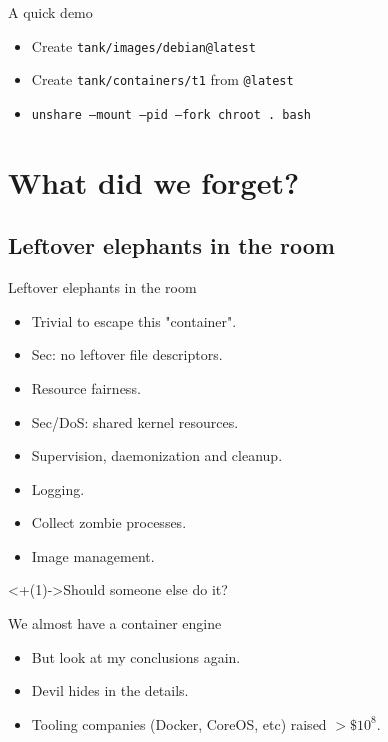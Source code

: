 \documentclass[14pt]{beamer}
\begin{document}
\begin{frame}{A quick demo}
    \small
    \begin{itemize}
        \item Create {\tt tank/images/debian@latest}
        \item Create {\tt tank/containers/t1} from {\tt @latest}
        \item {\tt unshare --mount --pid --fork chroot . bash}
    \end{itemize}
\end{frame}

\section{What did we forget?}
\subsection{Leftover elephants in the room}
\begin{frame}{Leftover elephants in the room}
    \begin{itemize}[<+(1)->]
        \item Trivial to escape this "container".
        \item Sec: no leftover file descriptors.
        \item Resource fairness.
        \item Sec/DoS: shared kernel resources.
        \item Supervision, daemonization and cleanup.
        \item Logging.
        \item Collect zombie processes.
        \item Image management.
    \end{itemize}
    \visible<+(1)->{Should someone else do it?}
\end{frame}

\begin{frame}{We almost have a container engine}
    \begin{itemize}[<+(1)->]
        \item But look at my conclusions again.
        \item Devil hides in the details.
        \item Tooling companies (Docker, CoreOS, etc) raised $>\$10^8$.
    \end{itemize}
\end{frame}
\end{document}
